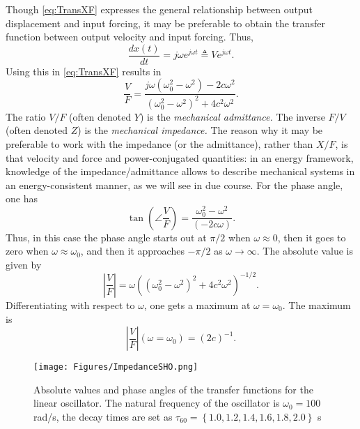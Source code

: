 \documentclass[11pt,twoside,a4paper,english]{book}
\begin{document}
Though \eqref{eq:TransXF} expresses the general relationship between output displacement and input forcing, it may be preferable to obtain the transfer function between output velocity and input forcing. Thus,
\begin{equation}
    \frac{dx(t)}{dt} = j\omega e^{j\omega t} \triangleq V e^{j\omega t}. 
\end{equation}
Using this in \eqref{eq:TransXF} results in
\begin{equation}
    \frac{V}{F} = \frac{j\omega(\omega_0^2 - \omega^2)-2c\omega^2}{(\omega_0^2-\omega^2)^2+4c^2\omega^2}.
\end{equation}
The ratio $V/F$ (often denoted $Y$) is the  \emph{mechanical admittance.} The inverse $F/V$ (often denoted $Z$) is the \emph{mechanical impedance.} The reason why it may be preferable to work with the impedance (or the admittance), rather than $X/F$, is that velocity and force and power-conjugated quantities: in an energy framework, knowledge of the impedance/admittance allows to describe mechanical systems in an energy-consistent manner, as we will see in due course. For the phase angle, one has
\begin{equation}
    \tan \left(\angle \frac{V}{F}\right) = \frac{\omega_0^2 - \omega^2}{(-2c\omega)}.
\end{equation}
Thus, in this case the phase angle starts out at $\pi/2$ when $\omega \approx 0$, then it goes to zero when $\omega \approx \omega_0$, and then it approaches $-\pi/2$ as $\omega \rightarrow \infty$. The absolute value is given by
\begin{equation}
    \left| \frac{V}{F} \right| = \omega \left((\omega_0^2-\omega^2)^2+4c^2\omega^2\right)^{-1/2}.
\end{equation}
Differentiating with respect to $\omega$, one gets a maximum at $\omega = \omega_0$. The maximum is 
\begin{equation}
    \left|\frac{V}{F}\right|(\omega = \omega_0) = (2c)^{-1}.
\end{equation}
\begin{figure}[hbt]
    \centering
    \texttt{[image: Figures/ImpedanceSHO.png]}
    \caption{Absolute values and phase angles of the transfer functions for the linear oscillator. The natural frequency of the oscillator is $\omega_0 = 100$ rad/s, the decay times are set as $\tau_{60}=\left\{1.0,1.2,1.4,1.6,1.8,2.0\right\}$ s}\label{fig:LinearTransFunctPlots}
\end{figure}
\end{document}
